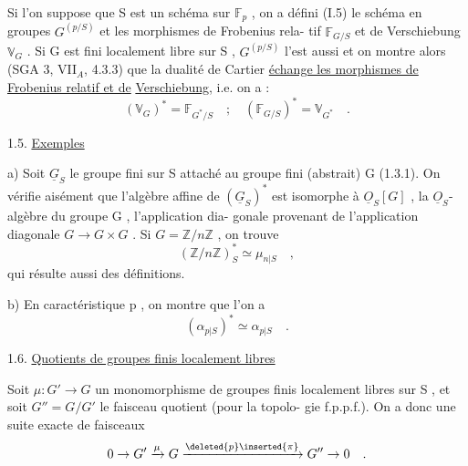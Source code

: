 
Si l'on suppose que  S  est un schéma sur  $\mathbb{F}_p$ , on a défini
(I.5) le schéma en groupes  $G^{(p/S)}$  et les morphismes de Frobenius rela-%
tif  $\mathbb{F}_{G/S}$  et de Verschiebung  $\mathbb{V}_G$ . Si  G  est fini localement libre sur
S , $G^{(p/S)}$  l'est aussi et on montre alors (SGA 3, VII$_A$, 4.3.3) que la
dualité de Cartier \uline{échange les morphismes de Frobenius relatif et de}
\uline{Verschiebung}, i.e. on a :
\[ (\mathbb{V}_G)^* = \mathbb{F}_{G^*/S} \quad ; \quad (\mathbb{F}_{G/S})^* = \mathbb{V}_{G^*} \quad . \]

1.5.   \uline{Exemples}

a) Soit  $\underline{G}_S$  le groupe fini sur  S  attaché au groupe fini
(abstrait)  G  (1.3.1). On vérifie aisément que l'algèbre affine de  $(\underline{G}_S)^*$
est isomorphe à  $\underline{O}_S[G]$ , la $\underline{O}_S$-algèbre du groupe  G , l'application dia-%
gonale provenant de l'application diagonale  $G \rightarrow G \times G$ . Si  $G = \mathbb{Z}/n\mathbb{Z}$ ,
on trouve
\[ (\mathbb{Z}/n\mathbb{Z})^*_S \simeq \mu_{n|S} \quad , \]
\margin{$\times$} qui résulte aussi   des définitions.

b) En caractéristique  p , on montre que l'on a
\[ (\alpha_{p|S})^* \simeq \alpha_{p|S} \quad . \]

1.6.   \uline{Quotients de groupes finis localement libres}

Soit  $\mu : G' \rightarrow G$  un monomorphisme de groupes finis localement
libres sur  S , et soit  $G'' = G/G'$  le faisceau quotient (pour la topolo-%
gie f.p.p.f.). On a donc une suite exacte de faisceaux
\margin{$\pi$}
\[ 0 \rightarrow G' \xrightarrow{\mu} G \xrightarrow{\deleted{p}\inserted{\pi}} G'' \rightarrow 0 \quad . \]

